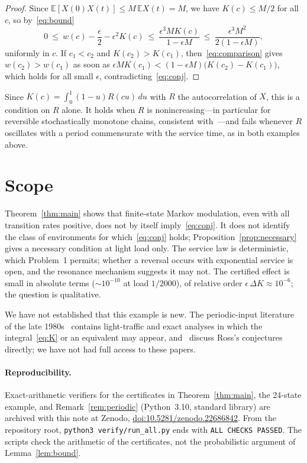 \documentclass[11pt]{article}
\newcommand{\E}{\mathbb{E}}
\newcommand{\eps}{\epsilon}
\theoremstyle{remark}
\begin{document}
\begin{proof}
Since $\E[X(0)X(t)]\le M\,\E X(t)=M$, we have $K(c)\le M/2$ for all $c$, so by~\eqref{eq:bound}
\[
0\ \le\ w(c)-\frac{\eps}{2}-\eps^2K(c)\ \le\ \frac{\eps^3 M K(c)}{1-\eps M}\ \le\ \frac{\eps^3M^2}{2(1-\eps M)},
\]
uniformly in $c$. If $c_1<c_2$ and $K(c_2)>K(c_1)$, then~\eqref{eq:comparison} gives $w(c_2)>w(c_1)$ as soon as $\eps M K(c_1)<(1-\eps M)\big(K(c_2)-K(c_1)\big)$, which holds for all small $\eps$, contradicting~\eqref{eq:conj}.
\end{proof}

Since $K(c)=\int_0^1(1-u)R(cu)\,du$ with $R$ the autocorrelation of $X$, this is a condition on $R$ alone. It holds when $R$ is nonincreasing---in particular for reversible stochastically monotone chains, consistent with~\cite{br}---and fails whenever $R$ oscillates with a period commensurate with the service time, as in both examples above.

\section{Scope}\label{sec:scope}

Theorem~\ref{thm:main} shows that finite-state Markov modulation, even with all transition rates positive, does not by itself imply~\eqref{eq:conj}. It does not identify the class of environments for which~\eqref{eq:conj} holds; Proposition~\ref{prop:necessary} gives a necessary condition at light load only. The service law is deterministic, which Problem~1 permits; whether a reversal occurs with exponential service is open, and the resonance mechanism suggests it may not. The certified effect is small in absolute terms ($\sim10^{-10}$ at load $1/2000$), of relative order $\eps\,\Delta K\approx10^{-6}$; the question is qualitative.

We have not established that this example is new. The periodic-input literature of the late 1980s~\cite{rolski87,rolski89,lemoine} contains light-traffic and exact analyses in which the integral~\eqref{eq:K} or an equivalent may appear, and~\cite{heyman,mr} discuss Ross's conjectures directly; we have not had full access to these papers.

\paragraph{Reproducibility.} Exact-arithmetic verifiers for the certificates in Theorem~\ref{thm:main}, the 24-state example, and Remark~\ref{rem:periodic} (Python~3.10, standard library) are archived with this note at Zenodo, \href{https://doi.org/10.5281/zenodo.22686842}{doi:10.5281/zenodo.22686842}. From the repository root, \texttt{python3 verify/run\_all.py} ends with \texttt{ALL CHECKS PASSED}. The scripts check the arithmetic of the certificates, not the probabilistic argument of Lemma~\ref{lem:bound}.
\end{document}
